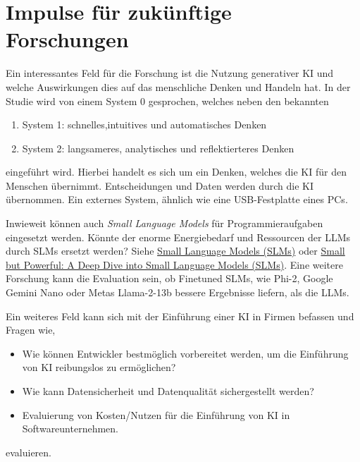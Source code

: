 \section{Impulse für zukünftige Forschungen}
Ein interessantes Feld für die Forschung ist die Nutzung generativer KI und welche Auswirkungen dies auf das menschliche Denken und Handeln hat. In der Studie \cite{chiriatti-2024} wird von einem System 0 gesprochen, welches neben den bekannten 
\begin{enumerate}
	\item System 1: schnelles,intuitives und automatisches Denken
	\item System 2: langsameres, analytisches und reflektierteres Denken
\end{enumerate}

eingeführt wird. Hierbei handelt es sich um ein Denken, welches die KI für den Menschen übernimmt. Entscheidungen und Daten werden durch die KI übernommen. Ein externes System, ähnlich wie eine USB-Festplatte eines PCs.\vspace{0.2cm}

Inwieweit können auch \textit{Small Language Models} für Programmieraufgaben eingesetzt werden. Könnte der enorme Energiebedarf und Ressourcen der LLMs durch SLMs ersetzt werden? Siehe 
\href{https://medium.com/@nageshmashette32/small-language-models-slms-305597c9edf2}{Small Language Models (SLMs)} oder \href{https://medium.com/version-1/small-but-powerful-a-deep-dive-into-small-language-models-slms-b793bdb002f2}{Small but Powerful: A Deep Dive into Small Language Models (SLMs)}. Eine weitere Forschung kann die Evaluation sein, ob Finetuned SLMs, wie Phi-2, Google Gemini Nano oder Metas Llama-2-13b bessere Ergebnisse liefern, als die LLMs.\vspace{0.2cm}

Ein weiteres Feld kann sich mit der Einführung einer KI in Firmen befassen und Fragen wie,

\begin{itemize}
	\item Wie können Entwickler bestmöglich vorbereitet werden, um die Einführung von KI reibungslos zu ermöglichen?
	\item Wie kann Datensicherheit und Datenqualität sichergestellt werden?
	\item Evaluierung von Kosten/Nutzen für die Einführung von KI in Softwareunternehmen.
\end{itemize}

evaluieren.


